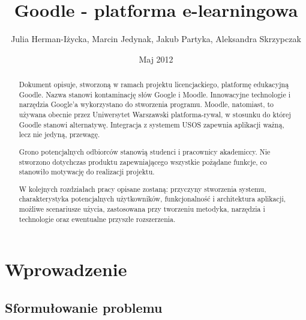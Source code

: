 \documentclass{pracamgr}
\author{Julia Herman-Iżycka, Marcin Jedynak, Jakub Partyka, Aleksandra Skrzypczak}
\title{Goodle - platforma e-learningowa}
\date{Maj 2012}
\begin{document}
\maketitle

%
%
\begin{abstract}
Dokument opisuje, stworzoną w ramach projektu licencjackiego, platformę 
edukacyjną Goodle. Nazwa stanowi kontaminację słów Google i Moodle. 
Innowacyjne technologie i narzędzia Google'a wykorzystano do stworzenia
programu. Moodle, natomiast, to używana obecnie przez Uniwersytet Warszawski
platforma-rywal, w stosunku do której Goodle stanowi alternatywę. Integracja z
systemem USOS zapewnia aplikacji ważną, lecz nie jedyną, przewagę. 

Grono potencjalnych odbiorców stanowią studenci i pracownicy akademiccy. Nie 
stworzono dotychczas produktu zapewniającego wszystkie pożądane funkcje, co 
stanowiło motywację do realizacji projektu. 

W kolejnych rozdziałach pracy opisane zostaną: przyczyny stworzenia systemu,
charakterystyka potencjalnych użytkowników, funkcjonalność i architektura 
aplikacji, możliwe scenariusze użycia, zastosowana przy tworzeniu metodyka,
narzędzia i technologie oraz ewentualne przyszłe rozszerzenia.
\end{abstract}

\tableofcontents

\chapter*{Wprowadzenie} %

%
%
\section{Sformułowanie problemu}



%
%
\end{document}
